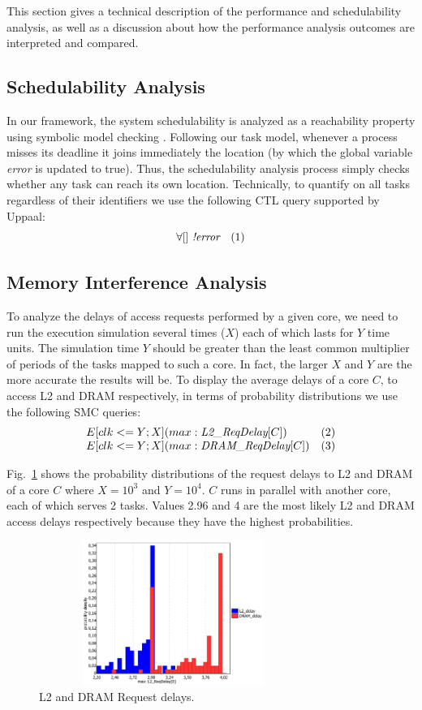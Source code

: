 \label{sec:analysis}
This section gives a technical description of the performance and schedulability analysis, as well as a discussion about how the  performance analysis outcomes are interpreted and compared. 

\subsection{Schedulability Analysis}
In our framework, the system schedulability is analyzed as a reachability property using symbolic model checking \cite{Facs2013}. Following our task model, whenever a process misses its deadline it joins immediately the location  (by which the global variable \emph{error} is updated to true). Thus, the schedulability analysis process simply checks whether any task can reach its own  location. Technically, to quantify on all tasks regardless of their identifiers we use the following CTL query supported by Uppaal: \[ \forall []~ \emph{!error}~~~(1)
\]

\subsection{Memory Interference Analysis}
To analyze the delays of access requests performed by a given core, we need to run the execution simulation several times ($X$) each of which lasts for $Y$ time units. The simulation time $Y$ should be greater than the least common multiplier of periods of the tasks mapped to such a core. In fact, the larger $X$ and $Y$ are the more accurate the results will be. To display the average delays of a core $C$, to access L2 and DRAM respectively, in terms of probability distributions we use the following SMC queries: 
\[\begin{array}{ll} E[clk<=Y;X](max:\emph{L2\_ReqDelay}[C]) & (2) \\
                    E[clk<=Y;X](max:\emph{DRAM\_ReqDelay}[C]) & (3) \end{array}
\]

Fig.~\ref{fig:delays} shows the probability distributions of the request delays to L2 and DRAM of a core $C$ where $X=10^3$ and $Y=10^4$. $C$ runs in parallel with another core, each of which serves 2 tasks. Values 2.96 and 4 are the most likely L2 and DRAM access delays respectively because they have the highest probabilities. 

\begin{figure}[ht!]
\centering
\vspace{-5mm}
\caption{L2 and DRAM Request delays.}
\label{fig:delays}
\includegraphics[width=87mm,height=47mm]{Both-delays.pdf}
\end{figure}

